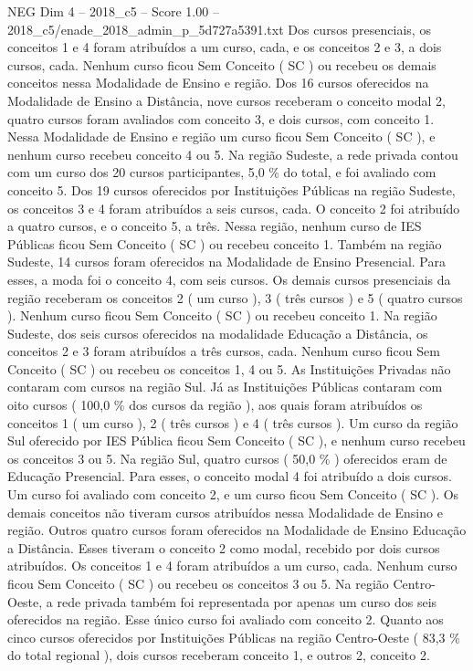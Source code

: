 \begin{textsample}{NEG Dim 4 – 2018\_c5 – Score 1.00 – 2018\_c5/enade\_2018\_admin\_p\_5d727a5391.txt}
Dos cursos presenciais, os conceitos 1 e 4 foram atribuídos a um curso, cada, e os conceitos 2 e 3, a dois cursos, cada.
Nenhum curso ficou Sem Conceito ( SC ) ou recebeu os demais conceitos nessa Modalidade de Ensino e região.
Dos 16 cursos oferecidos na Modalidade de Ensino a Distância, nove cursos receberam o conceito modal 2, quatro cursos foram avaliados com conceito 3, e dois cursos, com conceito 1.
Nessa Modalidade de Ensino e região um curso ficou Sem Conceito ( SC ), e nenhum curso recebeu conceito 4 ou 5.
Na região Sudeste, a rede privada contou com um curso dos 20 cursos participantes, 5,0 \% do total, e foi avaliado com conceito 5.
Dos 19 cursos oferecidos por Instituições Públicas na região Sudeste, os conceitos 3 e 4 foram atribuídos a seis cursos, cada.
O conceito 2 foi atribuído a quatro cursos, e o conceito 5, a três.
Nessa região, nenhum curso de IES Públicas ficou Sem Conceito ( SC ) ou recebeu conceito 1.
Também na região Sudeste, 14 cursos foram oferecidos na Modalidade de Ensino Presencial.
Para esses, a moda foi o conceito 4, com seis cursos.
Os demais cursos presenciais da região receberam os conceitos 2 ( um curso ), 3 ( três cursos ) e 5 ( quatro cursos ).
Nenhum curso ficou Sem Conceito ( SC ) ou recebeu conceito 1.
Na região Sudeste, dos seis cursos oferecidos na modalidade Educação a Distância, os conceitos 2 e 3 foram atribuídos a três cursos, cada.
Nenhum curso ficou Sem Conceito ( SC ) ou recebeu os conceitos 1, 4 ou 5.
As Instituições Privadas não contaram com cursos na região Sul.
Já as Instituições Públicas contaram com oito cursos ( 100,0 \% dos cursos da região ), aos quais foram atribuídos os conceitos 1 ( um curso ), 2 ( três cursos ) e 4 ( três cursos ).
Um curso da região Sul oferecido por IES Pública ficou Sem Conceito ( SC ), e nenhum curso recebeu os conceitos 3 ou 5.
Na região Sul, quatro cursos ( 50,0 \% ) oferecidos eram de Educação Presencial.
Para esses, o conceito modal 4 foi atribuído a dois cursos.
Um curso foi avaliado com conceito 2, e um curso ficou Sem Conceito ( SC ).
Os demais conceitos não tiveram cursos atribuídos nessa Modalidade de Ensino e região.
Outros quatro cursos foram oferecidos na Modalidade de Ensino Educação a Distância.
Esses tiveram o conceito 2 como modal, recebido por dois cursos atribuídos.
Os conceitos 1 e 4 foram atribuídos a um curso, cada.
Nenhum curso ficou Sem Conceito ( SC ) ou recebeu os conceitos 3 ou 5.
Na região Centro-Oeste, a rede privada também foi representada por apenas um curso dos seis oferecidos na região.
Esse único curso foi avaliado com conceito 2.
Quanto aos cinco cursos oferecidos por Instituições Públicas na região Centro-Oeste ( 83,3 \% do total regional ), dois cursos receberam conceito 1, e outros 2, conceito 2.

\end{textsample}
